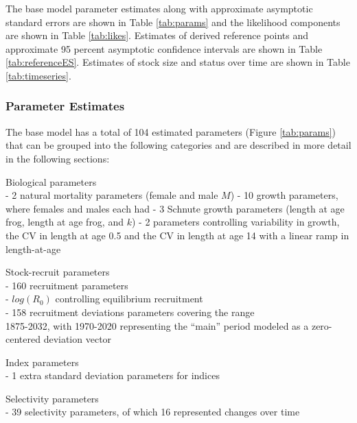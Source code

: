 \documentclass[11pt,
  english,
  a4paper,
]{article}
\begin{document}
\leavevmode\tagmcend\tagstructend

The base model parameter estimates along with approximate asymptotic standard errors are shown in Table \ref{tab:params} and the likelihood components are shown in Table \ref{tab:likes}. Estimates of derived reference points and approximate 95 percent asymptotic confidence intervals are shown in Table \ref{tab:referenceES}. Estimates of stock size and status over time are shown in Table \ref{tab:timeseries}.


\hypertarget{parameter-estimates}{%
\subsubsection{Parameter Estimates}\label{parameter-estimates}}

\leavevmode\tagmcend\tagstructend

The base model has a total of 104 estimated parameters (Figure \ref{tab:params}) that can be grouped into the following categories and are described in more detail in the following sections:

Biological parameters\\
- 2 natural mortality parameters (female and male {\(M\)\leavevmode\tagmcend\tagstructend}) - 10 growth parameters, where females and males each had - 3 Schnute growth parameters (length at age frog, length at age frog, and {\(k\)\leavevmode\tagmcend\tagstructend}) - 2 parameters controlling variability in growth, the CV in length at age 0.5 and the CV in length at age 14 with a linear ramp in length-at-age

Stock-recruit parameters\\
- 160 recruitment parameters\\
- {\(log(R_0)\)\leavevmode\tagmcend\tagstructend} controlling equilibrium recruitment\\
- 158 recruitment deviations parameters covering the range\\
1875-2032, with 1970-2020 representing the ``main'' period modeled as a zero-centered deviation vector

Index parameters\\
- 1 extra standard deviation parameters for indices

Selectivity parameters\\
- 39 selectivity parameters, of which 16 represented changes over time
\end{document}
